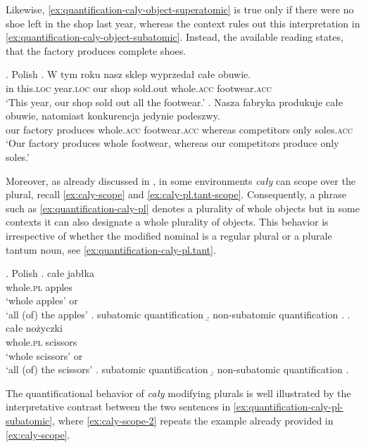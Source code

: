 \pagebreak Likewise, \ref{ex:quantification-caly-object-superatomic} is true only if there were no shoe left in the shop last year, whereas the context rules out this interpretation in \ref{ex:quantification-caly-object-subatomic}. Instead, the available reading states, that the factory produces complete shoes. 

\ex. Polish\label{ex:quantification-caly-object-ambiguity}
\ag. W tym roku nasz sklep wyprzedał całe obuwie.\label{ex:quantification-caly-object-superatomic}\\
in this\textsc{.loc} year\textsc{.loc} our shop sold.out whole\textsc{.acc} footwear\textsc{.acc}\\
`This year, our shop sold out all the footwear.'
\bg. Nasza fabryka produkuje całe obuwie, natomiast konkurencja jedynie podeszwy.\label{ex:quantification-caly-object-subatomic}\\
our factory produces whole\textsc{.acc} footwear\textsc{.acc} whereas competitors only soles\textsc{.acc}\\
`Our factory produces whole footwear, whereas our competitors produce only soles.'

Moreover, as already discussed in , in some environments \textit{cały} can scope over the plural, recall \ref{ex:caly-scope} and \ref{ex:caly-pl.tant-scope}. Consequently, a phrase such as \ref{ex:quantification-caly-pl} denotes a plurality of whole objects but in some contexts it can also designate a whole plurality of objects. This behavior is irrespective of whether the modified nominal is a regular plural or a plurale tantum noun, see \ref{ex:quantification-caly-pl.tant}.
		
		\ex. Polish\label{ex:quantification-caly-pl-pl.tant}
        \ag. całe jabłka\label{ex:quantification-caly-pl}\\
		whole\textsc{.pl} apples\\
		`whole apples' or\\
		`all (of) the apples'
		\a. subatomic quantification
		\b. non-subatomic quantification
        \z.
        \bg. całe nożyczki\label{ex:quantification-caly-pl.tant}\\
		whole\textsc{.pl} scissors\\
		`whole scissors' or\\
		`all (of) the scissors'
		\a. subatomic quantification
		\b. non-subatomic quantification
        \z.

The quantificational behavior of \textit{cały} modifying plurals is well illustrated by the interpretative contrast between the two sentences in \ref{ex:quantification-caly-pl-subatomic}, where \ref{ex:caly-scope-2} repeats the example already provided in \ref{ex:caly-scope}.\pagebreak

